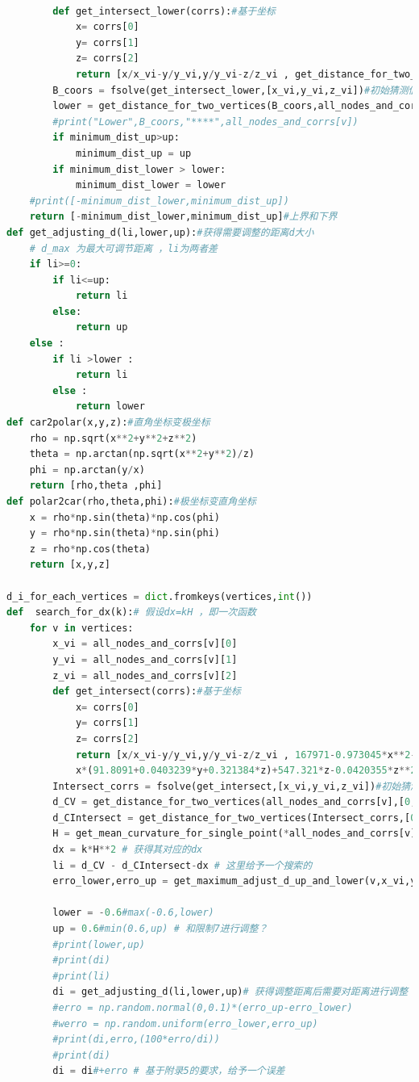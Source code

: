 \documentclass[withoutpreface,bwprint]{cumcmthesis} %
\begin{document}
\begin{appendices}
\begin{lstlisting}[language=python]
        
        def get_intersect_lower(corrs):#基于坐标
            x= corrs[0]
            y= corrs[1]
            z= corrs[2]
            return [x/x_vi-y/y_vi,y/y_vi-z/z_vi , get_distance_for_two_vertices([x,y,z],all_nodes_and_corrs[v_adjacent])-Wij*(1+0.0007)]
        B_coors = fsolve(get_intersect_lower,[x_vi,y_vi,z_vi])#初始猜测值[0,-1]
        lower = get_distance_for_two_vertices(B_coors,all_nodes_and_corrs[v])
        #print("Lower",B_coors,"****",all_nodes_and_corrs[v])
        if minimum_dist_up>up:
            minimum_dist_up = up
        if minimum_dist_lower > lower:
            minimum_dist_lower = lower 
    #print([-minimum_dist_lower,minimum_dist_up])
    return [-minimum_dist_lower,minimum_dist_up]#上界和下界
def get_adjusting_d(li,lower,up):#获得需要调整的距离d大小
    # d_max 为最大可调节距离 ，li为两者差
    if li>=0:
        if li<=up:
            return li
        else:
            return up
    else :
        if li >lower :
            return li
        else :
            return lower 
def car2polar(x,y,z):#直角坐标变极坐标
    rho = np.sqrt(x**2+y**2+z**2)
    theta = np.arctan(np.sqrt(x**2+y**2)/z)
    phi = np.arctan(y/x)
    return [rho,theta ,phi]
def polar2car(rho,theta,phi):#极坐标变直角坐标
    x = rho*np.sin(theta)*np.cos(phi)
    y = rho*np.sin(theta)*np.sin(phi)
    z = rho*np.cos(theta)
    return [x,y,z]

d_i_for_each_vertices = dict.fromkeys(vertices,int())
def  search_for_dx(k):# 假设dx=kH ，即一次函数
    for v in vertices:
        x_vi = all_nodes_and_corrs[v][0]
        y_vi = all_nodes_and_corrs[v][1]
        z_vi = all_nodes_and_corrs[v][2]
        def get_intersect(corrs):#基于坐标
            x= corrs[0]
            y= corrs[1]
            z= corrs[2]
            return [x/x_vi-y/y_vi,y/y_vi-z/z_vi , 167971-0.973045*x**2-0.984919*y**2+y*(68.671+0.240387*z)+
            x*(91.8091+0.0403239*y+0.321384*z)+547.321*z-0.0420355*z**2]
        Intersect_corrs = fsolve(get_intersect,[x_vi,y_vi,z_vi])#初始猜测值[0,-1]
        d_CV = get_distance_for_two_vertices(all_nodes_and_corrs[v],[0,0,0])
        d_CIntersect = get_distance_for_two_vertices(Intersect_corrs,[0,0,0])
        H = get_mean_curvature_for_single_point(*all_nodes_and_corrs[v]) # 获得其对应的曲率
        dx = k*H**2 # 获得其对应的dx 
        li = d_CV - d_CIntersect-dx # 这里给予一个搜索的 
        erro_lower,erro_up = get_maximum_adjust_d_up_and_lower(v,x_vi,y_vi,z_vi) # 给予一个随机误差的范围
        
        lower = -0.6#max(-0.6,lower)
        up = 0.6#min(0.6,up) # 和限制7进行调整？
        #print(lower,up)
        #print(di)
        #print(li)
        di = get_adjusting_d(li,lower,up)# 获得调整距离后需要对距离进行调整
        #erro = np.random.normal(0,0.1)*(erro_up-erro_lower)
        #werro = np.random.uniform(erro_lower,erro_up)
        #print(di,erro,(100*erro/di))
        #print(di)
        di = di#+erro # 基于附录5的要求，给予一个误差
       

\end{lstlisting}
\end{appendices}
\end{document}
